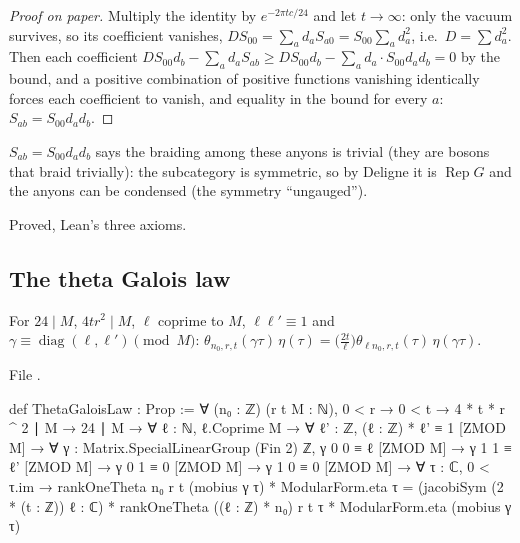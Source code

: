 \begin{proof}[Proof on paper]
Multiply the identity by $e^{-2\pi tc/24}$ and let $t\to\infty$: only the vacuum survives, so its coefficient
vanishes, $DS_{00}=\sum_ad_aS_{a0}=S_{00}\sum_ad_a^2$, i.e.\ $D=\sum d_a^2$. Then each coefficient
$DS_{00}d_b-\sum_ad_aS_{ab}\ge DS_{00}d_b-\sum_a d_a\cdot S_{00}d_ad_b=0$ by the bound, and a positive combination of
positive functions vanishing identically forces each coefficient to vanish, and equality in the bound for every
$a$: $S_{ab}=S_{00}d_ad_b$.
\end{proof}

\begin{physics}
$S_{ab}=S_{00}d_ad_b$ says the braiding among these anyons is trivial (they are bosons that braid trivially): the
subcategory is symmetric, so by Deligne it is $\operatorname{Rep}G$ and the anyons can be condensed (the
symmetry ``ungauged'').
\end{physics}

\begin{status}
Proved, Lean's three axioms.
\end{status}

\subsection{The theta Galois law}

\begin{definition}\label{l22:def:galoislaw}
For $24\mid M$, $4tr^2\mid M$, $\ell$ coprime to $M$, $\ell\ell'\equiv1$ and $\gamma\equiv\operatorname{diag}(\ell,\ell')
\pmod M$: $\theta_{n_0,r,t}(\gamma\tau)\,\eta(\tau)=\bigl(\tfrac{2t}{\ell}\bigr)\theta_{\ell n_0,r,t}(\tau)\,\eta(\gamma\tau)$.
\end{definition}
\noindent File .
\begin{leancode}
def ThetaGaloisLaw : Prop :=
  ∀ (n₀ : ℤ) (r t M : ℕ), 0 < r → 0 < t → 4 * t * r ^ 2 ∣ M → 24 ∣ M →
    ∀ ℓ : ℕ, ℓ.Coprime M → ∀ ℓ' : ℤ, (ℓ : ℤ) * ℓ' ≡ 1 [ZMOD M] →
    ∀ γ : Matrix.SpecialLinearGroup (Fin 2) ℤ,
      γ 0 0 ≡ ℓ [ZMOD M] → γ 1 1 ≡ ℓ' [ZMOD M] → γ 0 1 ≡ 0 [ZMOD M] → γ 1 0 ≡ 0 [ZMOD M] →
      ∀ τ : ℂ, 0 < τ.im →
        rankOneTheta n₀ r t (mobius γ τ) * ModularForm.eta τ =
          (jacobiSym (2 * (t : ℤ)) ℓ : ℂ) * rankOneTheta ((ℓ : ℤ) * n₀) r t τ *
            ModularForm.eta (mobius γ τ)
\end{leancode}

